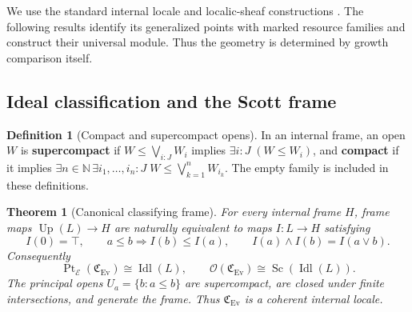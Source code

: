 \documentclass[11pt,a4paper]{article}
\numberwithin{algorithm}{section}
\numberwithin{equation}{section}
\newtheorem{theorem}{Theorem}[section]
\theoremstyle{definition}
\newtheorem{definition}[definition]{Definition}
\theoremstyle{remark}
\theoremstyle{plain}
\newcommand{\E}{\mathcal E}
\newcommand{\N}{\mathbb N}
\newcommand{\Idl}{\operatorname{Idl}}
\newcommand{\Sc}{\operatorname{Sc}}
\newcommand{\Ev}{{\operatorname{Ev}}}
\newcommand{\Cplx}{\mathfrak C_{\Ev}}
\newcommand{\Up}{\operatorname{Up}}
\theoremstyle{definition}
\theoremstyle{plain}
\begin{document}
 We use the standard internal locale and
localic-sheaf constructions \citep{Vickers,MacLaneMoerdijk}.
The following results identify its generalized points with marked
resource families and construct their universal module. Thus the
geometry is determined by growth comparison itself.

\subsection{Ideal classification and the Scott frame}

\begin{definition}[Compact and supercompact opens]\label{def:compact-opens}
In an internal frame, an open $W$ is
\textbf{supercompact} if $W\le\bigvee_{i:J}W_i$ implies
$\exists i:J\;(W\le W_i)$, and \textbf{compact} if it implies
$\exists n\in\N\,\exists i_1,\ldots,i_n:J\;
 W\le\bigvee_{k=1}^nW_{i_k}$.
The empty family is included in these definitions.
\end{definition}
\begin{theorem}[Canonical classifying frame]
\label{thm:classifying-frame}
For every internal frame $H$, frame maps
$\Up(L)\to H$ are naturally equivalent to maps $I:L\to H$
satisfying
\begin{equation}\label{eq:frame-ideals}
 I(0)=\top,\qquad
 a\le b\Rightarrow I(b)\le I(a),\qquad
 I(a)\wedge I(b)=I(a\vee b).
\end{equation}
Consequently
\[
 \operatorname{Pt}_{\E}(\Cplx)\cong\Idl(L),\qquad
 \mathcal O(\Cplx)\cong\Sc(\Idl(L)).
\]
The principal opens $U_a=\{b:a\le b\}$ are supercompact,
are closed under finite intersections, and generate the frame.
Thus $\Cplx$ is a coherent internal locale.
\end{theorem}
\end{document}
